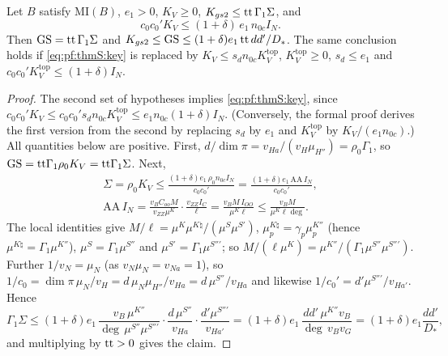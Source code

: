 \begin{lemma}\label{pf:thmS:massid}
Let $B$ satisfy $\mathrm{MI}(B)$, $e_1>0$, $K_V\ge0$, $K_{gs2}\le\mathrm{tt}\,\Gamma_1\Sigma$, and
\begin{equation}\label{eq:pf:thmS:key}
c_0c_0'K_V\le(1+\delta)\,e_1\,n_{0c}I_N.
\end{equation}
Then $\mathrm{GS}=\mathrm{tt}\,\Gamma_1\Sigma$ and $K_{gs2}\le\mathrm{GS}\le(1+\delta)e_1\,\mathrm{tt}\,dd'/D_*$. The same conclusion
holds if \eqref{eq:pf:thmS:key} is replaced by $K_V\le s_dn_{0c}K^{\mathrm{top}}_V$, $K^{\mathrm{top}}_V\ge0$, $s_d\le e_1$ and
$c_0c_0'K^{\mathrm{top}}_V\le(1+\delta)I_N$.
\end{lemma}

\begin{proof}
The second set of hypotheses implies \eqref{eq:pf:thmS:key}, since $c_0c_0'K_V\le c_0c_0's_dn_{0c}K^{\mathrm{top}}_V\le
e_1n_{0c}(1+\delta)I_N$. (Conversely, the formal proof derives the first version from the second by replacing $s_d$ by
$e_1$ and $K^{\mathrm{top}}_V$ by $K_V/(e_1n_{0c})$.) All quantities below are positive. First,
$d/\dim\pi=v_{Ha}/(v_H\mu_{H''})=\rho_0\Gamma_1$, so $\mathrm{GS}=\mathrm{tt}\Gamma_1\rho_0K_V=\mathrm{tt}\Gamma_1\Sigma$. Next,
\begin{gather*}
\Sigma=\rho_0K_V\le\frac{(1+\delta)e_1\,\rho_0n_{0c}I_N}{c_0c_0'}=\frac{(1+\delta)e_1\,\mathrm{AA}\,I_N}{c_0c_0'},\\
\mathrm{AA}\,I_N=\frac{v_BC_{oo}M}{v_{ZZ}\mu^K}\cdot\frac{v_{ZZ}I_C}{\ell}=\frac{v_BM\,I_{OO}}{\mu^K\ell}\le\frac{v_BM}{\mu^K\ell\deg}.
\end{gather*}
The local identities give $M/\ell=\mu^K\mu^{K\natural}/(\mu^S\mu^{S'})$, $\mu^{K\natural}_p=\gamma_p\mu^{K''}_p$ (hence
$\mu^{K\natural}=\Gamma_1\mu^{K''}$), $\mu^S=\Gamma_1\mu^{S''}$ and $\mu^{S'}=\Gamma_1\mu^{S''\prime}$; so
$M/(\ell\mu^K)=\mu^{K''}/(\Gamma_1\mu^{S''}\mu^{S''\prime})$. Further $1/v_N=\mu_N$ (as $v_N\mu_N=v_{Na}=1$), so
$1/c_0=\dim\pi\,\mu_N/v_H=d\,\mu_N\mu_{H''}/v_{Ha}=d\,\mu^{S''}/v_{Ha}$ and likewise $1/c_0'=d'\mu^{S''\prime}/v_{Ha'}$. Hence
\[
\Gamma_1\Sigma\le(1+\delta)e_1\,\frac{v_B\,\mu^{K''}}{\deg\,\mu^{S''}\mu^{S''\prime}}\cdot\frac{d\,\mu^{S''}}{v_{Ha}}\cdot
\frac{d'\mu^{S''\prime}}{v_{Ha'}}=(1+\delta)e_1\,\frac{dd'\,\mu^{K''}v_B}{\deg\,v_Bv_G}=(1+\delta)e_1\frac{dd'}{D_*},
\]
and multiplying by $\mathrm{tt}>0$ gives the claim.
\end{proof}

